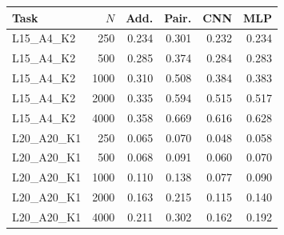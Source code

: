 \begin{tabular}{lrrrrr}
\toprule
Task & $N$ & Add. & Pair. & CNN & MLP\\
\midrule
L15\_A4\_K2 & 250 & 0.234 & 0.301 & 0.232 & 0.234\\
L15\_A4\_K2 & 500 & 0.285 & 0.374 & 0.284 & 0.283\\
L15\_A4\_K2 & 1000 & 0.310 & 0.508 & 0.384 & 0.383\\
L15\_A4\_K2 & 2000 & 0.335 & 0.594 & 0.515 & 0.517\\
L15\_A4\_K2 & 4000 & 0.358 & 0.669 & 0.616 & 0.628\\
\midrule
L20\_A20\_K1 & 250 & 0.065 & 0.070 & 0.048 & 0.058\\
L20\_A20\_K1 & 500 & 0.068 & 0.091 & 0.060 & 0.070\\
L20\_A20\_K1 & 1000 & 0.110 & 0.138 & 0.077 & 0.090\\
L20\_A20\_K1 & 2000 & 0.163 & 0.215 & 0.115 & 0.140\\
L20\_A20\_K1 & 4000 & 0.211 & 0.302 & 0.162 & 0.192\\
\bottomrule
\end{tabular}
